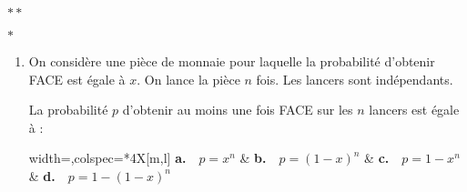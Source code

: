 \begin{center}
	$\ast\ast$
	
	\vspace*{-0.5\baselineskip}
	
	$\ast$
\end{center}

\begin{enumerate}[resume]
	\item On considère une pièce de monnaie pour laquelle la probabilité d'obtenir FACE est égale à $x$. On lance la pièce $n$ fois. Les lancers sont indépendants.
	
	La probabilité $p$ d'obtenir au moins une fois FACE sur les $n$ lancers est égale à :
	
	\medskip
	
	\begin{tblr}{width=\linewidth,colspec={*{4}{X[m,l]}}}
		\textbf{a.}~~$p=x^n$ & 
		\textbf{b.}~~$p=(1-x)^n$ & 
		\textbf{c.}~~$p=1-x^n$ &
		\textbf{d.}~~$p=1-(1-x)^n$
	\end{tblr}
\end{enumerate}